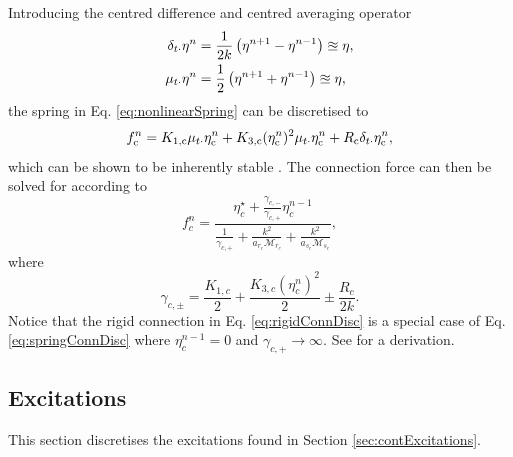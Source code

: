 \documentclass{article}
\begin{document}
Introducing the centred difference and centred averaging operator
\begin{align}
    \delta_{t\cdot} \eta^n &= \frac{1}{2k}\left(\eta^{n+1}-\eta^{n-1}\right)\approxeq \eta,\\
    \mu_{t\cdot} \eta^n &= \frac{1}{2}\left(\eta^{n+1}+\eta^{n-1}\right)\approxeq \eta,
\end{align}
the spring in Eq. \eqref{eq:nonlinearSpring} can be discretised to
\begin{equation}\label{eq:nonlinearSpringDisc}
    f_{\text{c}}^n = K_{1,\text{c}}\mu_{t\cdot}\eta_{\text{c}}^n + K_{3,\text{c}}(\eta_{\text{c}}^n)^2\mu_{t\cdot}\eta_{\text{c}}^n + R_{\text{c}}\delta_{t\cdot} \eta_{\text{c}}^n,
\end{equation}
which can be shown to be inherently stable \cite{theBible, Bilbao2009Modular}. The connection force can then be solved for according to
\begin{equation}\label{eq:springConnDisc}
    f_c^n = \frac{\eta_c^\star + \frac{\gamma_{c,-}}{\gamma_{c,+}}\eta_c^{n-1}}{\frac{1}{\gamma_{c,+}} + \frac{k^2}{a_{r_c}\mathcal{M}_{r_c}}+ \frac{k^2}{a_{s_c}\mathcal{M}_{s_c}}},
\end{equation}
where 
\begin{equation}
    \gamma_{c,\pm} = \frac{K_{1, c}}{2} + \frac{K_{3,c}(\eta_c^n)^2}{2} \pm \frac{R_c}{2k}.
\end{equation}
Notice that the rigid connection in Eq. \eqref{eq:rigidConnDisc} is a special case of Eq. \eqref{eq:springConnDisc} where $\eta^{n-1}_c = 0$ and $\gamma_{c, +} \rightarrow \infty$. See \cite[Ch. 11]{WillemsenThesis} for a derivation.

\subsection{Excitations}\label{sec:discExcitations}
This section discretises the excitations found in Section \ref{sec:contExcitations}. 
\end{document}
